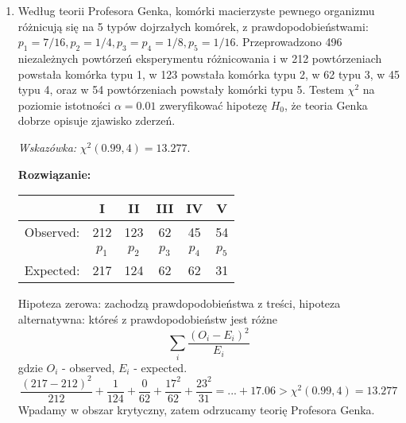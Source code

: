 \documentclass[11pt]{article}
\begin{document}
\begin{enumerate}
    \item Według teorii Profesora Genka, komórki macierzyste pewnego organizmu różnicują się na 5 typów dojrzałych komórek, z prawdopodobieństwami: \(p_1 = 7/16, p_2 = 1/4, p_3 = p_4 = 1/8, p_5 = 1/16\). Przeprowadzono 496 niezależnych powtórzeń eksperymentu różnicowania i w 212 powtórzeniach powstała komórka typu 1, w 123 powstała komórka typu 2, w 62 typu 3, w 45 typu 4, oraz w 54 powtórzeniach powstały komórki typu 5. Testem \(\chi^2\) na poziomie istotności \(\alpha = 0.01\) zweryfikować hipotezę \(H_0\), że  teoria Genka dobrze opisuje zjawisko zderzeń.
    \par 
    \textit{Wskazówka: } \(\chi^2(0.99, 4) = 13.277\). 
    \par 
    \textbf{Rozwiązanie: }
    \par
    
    \begin{center}
    \begin{tabular}{ |c|c|c|c|c|c| }
    \hline
     & I & II & III & IV & V \\ 
    \hline
    Observed: & 212 & 123 & 62 & 45 & 54 \\
    \hline 
     & \(p_1\) & \(p_2\) & \(p_3\) & \(p_4\) & \(p_5\)\\
    \hline 
    Expected: & 217 & 124 & 62 & 62 & 31 \\
    
    \hline
    \end{tabular}
    \end{center}
    Hipoteza zerowa: zachodzą prawdopodobieństwa z treści, hipoteza alternatywna: któreś z prawdopodobieństw jest różne 
    \[\sum_i \frac{(O_i - E_i)^2}{E_i}\]
    gdzie \(O_i\) - observed, \(E_i \) - expected. 
    \[\frac{(217-212)^2}{212} + \frac{1}{124} + \frac{0}{62} + \frac{17^2}{62} + \frac{23^2}{31} = ... + 17.06 > \chi^2(0.99,4) = 13.277\]
    Wpadamy w obszar krytyczny, zatem odrzucamy teorię Profesora Genka. 
    

\end{enumerate}
\end{document}
